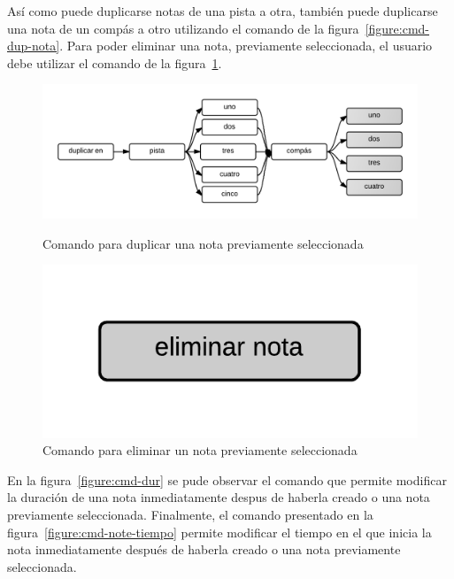 As\'i como puede duplicarse notas de una pista a otra, tambi\'en puede duplicarse una nota de un comp\'as a otro utilizando el comando
de la figura~\ref{figure:cmd-dup-nota}. Para poder eliminar una nota, previamente seleccionada, el usuario debe utilizar el comando
de la figura~\ref{figure:cmd-del-nota}.

\begin{figure}[H]
\begin{minipage}[b]{0.5\linewidth}
\centering
\includegraphics[width=1.2\linewidth]{./graphics/cmd-dup-nota.png}
\caption{Comando para duplicar una nota previamente seleccionada}
\label{figure:cmd-dup-nota}
\end{minipage}
\quad
\begin{minipage}[b]{0.5\linewidth}
\centering
\includegraphics[width=0.5\linewidth]{./graphics/del-note.png}
\caption{Comando para eliminar un nota previamente seleccionada}
\label{figure:cmd-del-nota}
\end{minipage}
\end{figure}

En la figura~\ref{figure:cmd-dur} se pude observar el comando que permite modificar la duraci\'on de 
una nota inmediatamente despus de haberla creado o una nota previamente seleccionada. Finalmente, el comando
presentado en la figura~\ref{figure:cmd-note-tiempo} permite modificar el tiempo en el que inicia la 
nota inmediatamente despu\'es de haberla creado o una nota previamente seleccionada.

